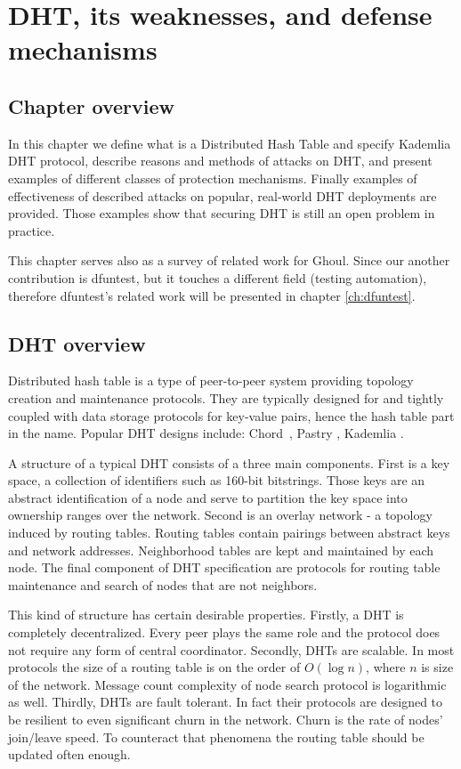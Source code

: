 \chapter{DHT, its weaknesses, and defense mechanisms}
\label{ch:threats}
\section{Chapter overview}
  In this chapter we define what is a Distributed Hash Table and specify
  Kademlia DHT protocol, describe reasons and methods of attacks on DHT, and
  present examples of different classes of protection mechanisms.
  Finally examples of effectiveness of described attacks on popular, real-world
  DHT deployments are provided.
  Those examples show that securing DHT is still an open problem in practice.

  This chapter serves also as a survey of related work for Ghoul.
  Since our another contribution is dfuntest, but it touches a different field 
  (testing automation), therefore dfuntest's related work will be presented in
  chapter \ref{ch:dfuntest}.

\section{DHT overview}

  Distributed hash table is a type of peer-to-peer system providing topology
  creation and maintenance protocols. They are typically designed for and
  tightly coupled with data storage protocols for key-value pairs, hence the
  hash table part in the name. Popular DHT designs include: Chord~\cite{sto03},
  Pastry \cite{row01}, Kademlia \cite{may02}.

  A structure of a typical DHT consists of a three main components. First is a
  key space, a collection of identifiers such as 160-bit bitstrings. Those keys
  are an abstract identification of a node and serve to partition the key space
  into ownership ranges over the network. Second is an overlay network - a
  topology induced by routing tables. Routing tables contain pairings between
  abstract keys and network addresses. Neighborhood tables are kept and
  maintained by each node. The final component of DHT specification are
  protocols for routing table maintenance and search of nodes that are not
  neighbors.

  This kind of structure has certain desirable properties. Firstly, a DHT is
  completely decentralized. Every peer plays the same role and the protocol does
  not require any form of central coordinator. Secondly, DHTs are scalable. In
  most protocols the size of a routing table is on the order of $O(\log n)$,
  where $n$ is size of the network. Message count complexity of node search
  protocol is logarithmic as well. Thirdly, DHTs are fault tolerant. In fact
  their protocols are designed to be resilient to even significant churn in the
  network. Churn is the rate of nodes' join/leave speed. To counteract that
  phenomena the routing table should be updated often enough.
 

